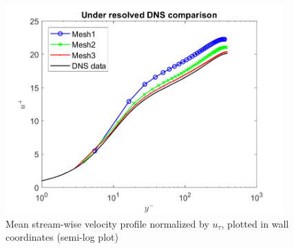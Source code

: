 \begin{figure}[t]
    \centering
    \includegraphics[width=0.95\textwidth]{06_Resultsanddiscussion/figur/UDNS_2016/Profile_wall_coords_theo_comp.png}
    \caption{Mean stream-wise  velocity profile normalized by $u_\tau$, plotted in wall coordinates (semi-log plot)}
    \label{Mean velocity wall}
\end{figure}

